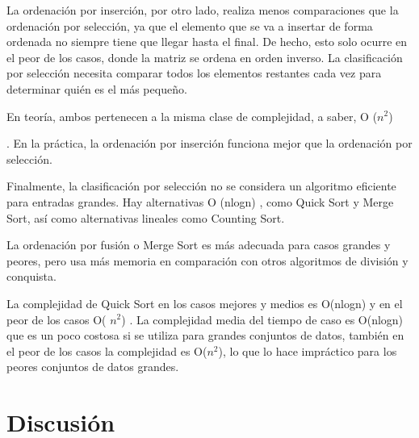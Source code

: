 \documentclass[a4paper]{article}
\begin{document}
La ordenación por inserción, por otro lado, realiza menos comparaciones que la ordenación por selección, ya que el elemento que se va a insertar de forma ordenada no siempre tiene que llegar hasta el final. De hecho, esto solo ocurre en el peor de los casos, donde la matriz se ordena en orden inverso. La clasificación por selección necesita comparar todos los elementos restantes cada vez para determinar quién es el más pequeño.

En teoría, ambos pertenecen a la misma clase de complejidad, a saber, O ($n^{2}$)

. En la práctica, la ordenación por inserción funciona mejor que la ordenación por selección.

Finalmente, la clasificación por selección no se considera un algoritmo eficiente para entradas grandes. Hay alternativas O (nlogn)
, como Quick Sort y Merge Sort, así como alternativas lineales como Counting Sort. 


La ordenación por fusión o Merge Sort es más adecuada para casos grandes y peores, pero usa más memoria en comparación con otros algoritmos de división y conquista.

\cite{rin}

La complejidad de Quick Sort en los casos mejores y medios  es O(nlogn) y en el peor de los casos O( $n^{2}$)  . La complejidad media del tiempo de caso es O(nlogn) que es un poco costosa si se utiliza para grandes conjuntos de datos, también en el peor de los casos la complejidad es O($n^{2}$), lo que lo hace impráctico para los peores conjuntos de datos grandes.

\section{Discusión}






\end{document}
